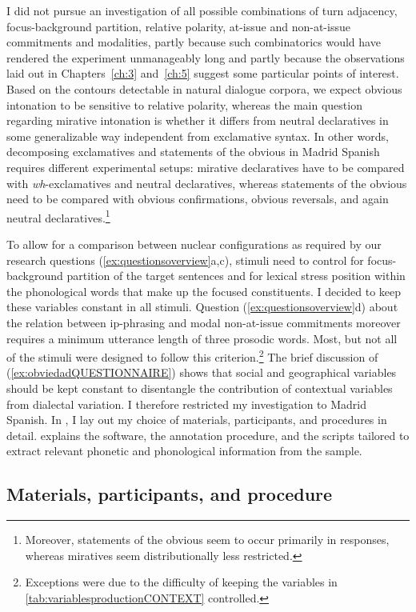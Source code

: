 I did not pursue an investigation of all possible combinations of turn adjacency, focus-background partition, relative polarity, at-issue and non-at-issue co\-mmit\-ments and modalities, partly because such combinatorics would have rendered the experiment unmanageably long and partly because the observations laid out in Chapters~\ref{ch:3} and~\ref{ch:5} suggest some particular points of interest. Based on the contours detectable in natural dialogue corpora, we expect obvious intonation to be sensitive to relative polarity, whereas the main question regarding mirative intonation is whether it differs from neutral declaratives in some generalizable way independent from exclamative syntax. In other words, decomposing exclamatives and statements of the obvious in Madrid Spanish requires different experimental setups: mirative declaratives have to be compared with \textit{wh}-exclamatives and neutral declaratives, whereas statements of the obvious need to be compared with obvious confirmations, obvious reversals, and again neutral declaratives.\footnote{Moreover, statements of the obvious seem to occur primarily in responses, whereas miratives seem distributionally less restricted.}

To allow for a comparison between nuclear configurations as required by our research questions (\ref{ex:questionsoverview}a,c), stimuli need to control for focus-background partition of the target sentences and for lexical stress position within the phonological words that make up the focused constituents. I decided to keep these variables constant in all stimuli. Question (\ref{ex:questionsoverview}d) about the relation between ip-phrasing and modal non-at-issue commitments moreover requires a minimum utterance length of three prosodic words. Most, but not all of the stimuli were designed to follow this criterion.\footnote{Exceptions were due to the difficulty of keeping the variables in \autoref{tab:variablesproductionCONTEXT} controlled.} The brief discussion of (\ref{ex:obviedadQUESTIONNAIRE}) shows that social and geographical variables should be kept constant to disentangle the contribution of contextual variables from dialectal variation. I therefore restricted my investigation to Madrid Spanish. In , I lay out my choice of materials, participants, and procedures in detail.  explains the software, the annotation procedure, and the scripts tailored to extract relevant phonetic and phonological information from the sample.

\subsection{Materials, participants, and procedure}
\label{ch:6.1.2}

